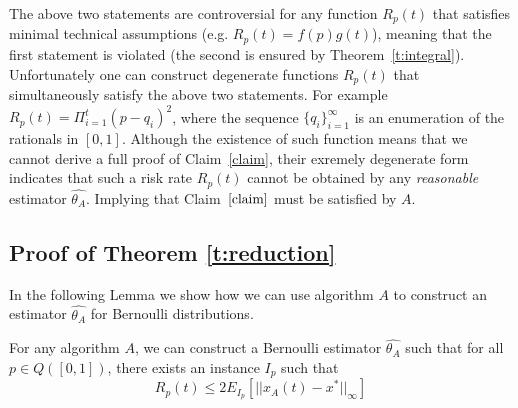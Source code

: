 The above two statements are controversial for any function $R_p(t)$ that satisfies minimal technical
assumptions (e.g. $R_p(t)=f(p)g(t)$), meaning that the first statement is violated (the second is ensured
by Theorem~\ref{t:integral}). Unfortunately one can construct degenerate functions $R_p(t)$
that simultaneously satisfy the above two statements. For example $R_p(t)=\Pi_{i=1}^t(p-q_i)^2$,
where the sequence $\{q_i\}_{i=1}^{\infty}$ is an enumeration of the rationals in $[0,1]$. Although
the existence of such function means that we cannot derive a full proof of Claim~\ref{claim}, their
exremely degenerate form indicates that such a risk rate $R_p(t)$ cannot be obtained by any
\emph{reasonable} estimator $\hat{\theta_A}$. Implying that Claim~$\ref{claim}$ must be satisfied by
$A$.

\subsection{Proof of Theorem \ref{t:reduction}}
\noindent In the following Lemma we show how we can use algorithm $A$ to construct an estimator $\hat{\theta_A}$ for Bernoulli distributions.
\begin{lemma}\label{l:reduction}
For any algorithm $A$, we can construct a Bernoulli estimator $\hat{\theta_A}$ such that for all $p \in Q([0,1])$, there exists an instance $I_p$ such that $$R_p(t) \leq 2E_{I_p}[||x_A(t)-x^*||_{\infty}]$$
\end{lemma}


